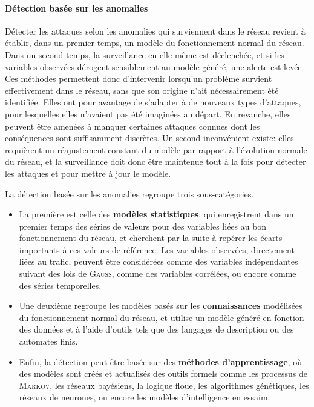        \paragraph{Détection basée sur les anomalies}
Détecter les attaques selon les anomalies qui surviennent dans le réseau revient à établir, dans un premier temps, un modèle du fonctionnement normal du réseau.
Dans un second temps, la surveillance en elle-même est déclenchée, et si les variables observées dérogent sensiblement au modèle généré, une alerte est levée.
Ces méthodes permettent donc d'intervenir lorsqu'un problème survient effectivement dans le réseau, sans que son origine n'ait nécessairement été identifiée.
Elles ont pour avantage de s'adapter à de nouveaux types d'attaques, pour lesquelles elles n'avaient pas été imaginées au départ.
En revanche, elles peuvent être amenées à manquer certaines attaques connues dont les conséquences sont suffisamment discrètes.
Un second inconvénient existe: elles requièrent un réajustement constant du modèle par rapport à l'évolution normale du réseau, et la surveillance doit donc être maintenue tout à la fois pour détecter les attaques et pour mettre à jour le modèle.

La détection basée sur les anomalies regroupe trois sous-catégories.
\begin{itemize}
    \item La première est celle des \textbf{modèles statistiques}, qui enregistrent dans un premier temps des séries de valeurs pour des variables liées au bon fonctionnement du réseau, et cherchent par la suite à repérer les écarts importants à ces valeurs de référence. Les variables observées, directement liées au trafic, peuvent être considérées comme des variables indépendantes suivant des lois de \textsc{Gauss}, comme des variables corrélées, ou encore comme des séries temporelles.
    \item Une deuxième regroupe les modèles basés sur les \textbf{connaissances} modélisées du fonctionnement normal du réseau, et utilise un modèle généré en fonction des données et à l'aide d'outils tels que des langages de description ou des automates finis.
    \item Enfin, la détection peut être basée sur des \textbf{méthodes d'apprentissage}, où des modèles sont créés et actualisés \via des outils formels comme les processus de \textsc{Markov}, les réseaux bayésiens, la logique floue, les algorithmes génétiques, les réseaux de neurones, ou encore les modèles d'intelligence en essaim.
\end{itemize}

